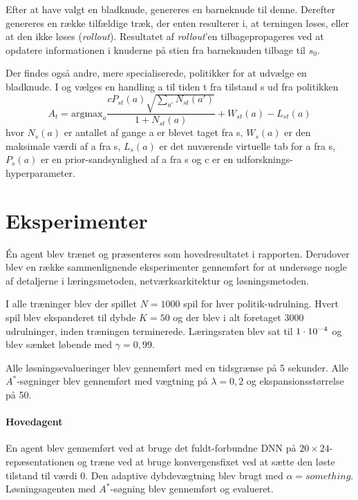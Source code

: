 \documentclass[../main.tex]{subfiles}
\begin{document}
Efter at have valgt en bladknude, genereres en barneknude til denne.
Derefter genereres en række tilfældige træk, der enten resulterer i, at terningen løses, eller at den ikke løses (\emph{rollout}).
Resultatet af \emph{rollout}'en tilbagepropageres ved at opdatere informationen i knuderne på stien fra barneknuden tilbage til $s_0$. 

Der findes også andre, mere specialiserede, politikker for at udvælge en bladknude.
I \cite{HumansBeGone} og \cite{mcaleer2018solving} vælges en handling a til tiden t fra tilstand s ud fra politikken
$$A_t=\text{argmax}_a\frac{cP_{st}(a)\sqrt{\sum_{a'}N_{st}(a')}}{1+N_{st}(a)} + W_{st}(a) - L_{st}(a)$$
hvor $N_s(a)$ er antallet af gange a er blevet taget fra s, $W_s(a)$ er den maksimale værdi af a fra s, $L_s(a)$ er det nuværende virtuelle tab for a fra s, $P_s(a)$ er en prior-sandsynlighed af a fra s og c er en udforsknings-hyperparameter. 
  

\section{Eksperimenter}
Én agent blev trænet og præsenteres som hovedresultatet i rapporten.
Derudover blev en række sammenlignende eksperimenter gennemført for at undersøge nogle af detaljerne i læringsmetoden, netværksarkitektur og løsningsmetoden.

I alle træninger blev der spillet \(N=1000\) spil for hver politik-udrulning. 
Hvert spil blev ekspanderet til dybde \(K=50\) og der blev i alt foretaget \(3000\) udrulninger, inden træningen terminerede.
Læringsraten blev sat til \(1\cdot10^{-4}\) og blev sænket løbende med \(\gamma = 0,99\).

Alle løsningsevalueringer blev gennemført med en tidsgrænse på 5 sekunder.
Alle \(A^*\)-søgninger blev gennemført med vægtning på \(\lambda=0,2\) og ekspansionsstørrelse på 50.
\paragraph{Hovedagent} 
En agent blev gennemført ved at bruge det fuldt-forbundne DNN på \(20\times24\)-repæsentationen og træne ved at bruge konvergensfixet ved at sætte den løste tilstand til værdi 0.
Den adaptive dybdevægtning blev brugt med \(\alpha=something\). 
Løsningsagenten med \(A^*\)-søgning blev gennemført og evalueret.
\end{document}
